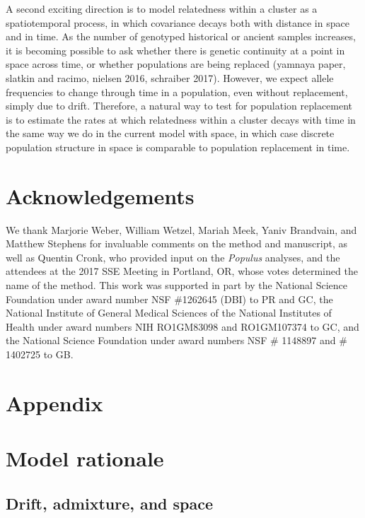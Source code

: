 \documentclass[12pt]{article}
\begin{document}
A second exciting direction is to model relatedness within a cluster as a spatiotemporal process, 
in which covariance decays both with distance in space and in time.  
As the number of genotyped historical or ancient samples increases, 
it is becoming possible to ask whether there is genetic continuity at a point in space across time, 
or whether populations are being replaced (yamnaya paper, slatkin and racimo, nielsen 2016, schraiber 2017).
However, we expect allele frequencies to change through time in a population, even without replacement, 
simply due to drift.
Therefore, a natural way to test for population replacement is to estimate the rates 
at which relatedness within a cluster decays with time in the same way we do in the current model with space, 
in which case discrete population structure in space is comparable to population replacement in time.

\section*{Acknowledgements}

We thank Marjorie Weber, William Wetzel, Mariah Meek, Yaniv Brandvain, and Matthew Stephens 
for invaluable comments on the method and manuscript, 
as well as Quentin Cronk, who provided input on the \textit{Populus} analyses, 
and the attendees at the 2017 SSE Meeting in Portland, OR, 
whose votes determined the name of the method.
This work was supported in part by 
the National Science Foundation under award number NSF \#1262645 (DBI) to PR and GC, 
the National Institute of General Medical Sciences of the National Institutes of Health under award numbers NIH RO1GM83098 and RO1GM107374 to GC,
and the National Science Foundation under award numbers NSF \# 1148897 and \# 1402725 to GB.

\newpage
\section*{Appendix}
\renewcommand{\theequation}{A\arabic{equation}}
\setcounter{equation}{0}
\renewcommand{\thetable}{A\arabic{table}}
\setcounter{table}{0}
\renewcommand{\thefigure}{A\arabic{figure}}
\setcounter{figure}{0}
\renewcommand{\thesection}{A\arabic{section}}
\setcounter{section}{0}


\section{Model rationale}
\subsection{Drift, admixture, and space}
\end{document}
